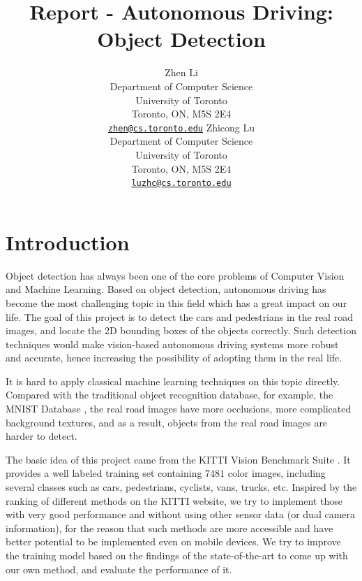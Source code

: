 \documentclass{article} %
\title{Report - Autonomous Driving: Object Detection}
\author{
Zhen Li \\
Department of Computer Science\\
University of Toronto\\
Toronto, ON, M5S 2E4 \\
\href{mailto:zhen@cs.toronto.edu}{\texttt{zhen@cs.toronto.edu}}
\And
Zhicong Lu \\
Department of Computer Science\\
University of Toronto\\
Toronto, ON, M5S 2E4 \\
\href{mailto:luzhc@cs.toronto.edu}{\texttt{luzhc@cs.toronto.edu}}
}
\begin{document}
\maketitle

\section{Introduction}

Object detection has always been one of the core problems of Computer Vision and Machine Learning. Based on object detection, autonomous driving has become the most challenging topic in this field which has a great impact on our life. The goal of this project is to detect the cars and pedestrians in the real road images, and locate the 2D bounding boxes of the objects correctly. Such detection techniques would make vision-based autonomous driving systems more robust and accurate, hence increasing the possibility of adopting them in the real life. 

It is hard to apply classical machine learning techniques on this topic directly. Compared with the traditional object recognition database, for example, the MNIST Database \cite{lecun1998gradient}, the real road images have more occlusions, more complicated background textures, and as a result, objects from the real road images are harder to detect. 

The basic idea of this project came from the KITTI Vision Benchmark Suite \cite{Geiger2012CVPR}. It provides a well labeled training set containing $7481$ color images, including several classes such as cars, pedestrians, cyclists, vans, trucks, etc. Inspired by the ranking of different methods on the KITTI website, we try to implement those with very good performance and without using other sensor data (or dual camera information), for the reason that such methods are more accessible and have better potential to be implemented even on mobile devices. We try to improve the training model based on the findings of the state-of-the-art to come up with our own method, and evaluate the performance of it. 
\end{document}
